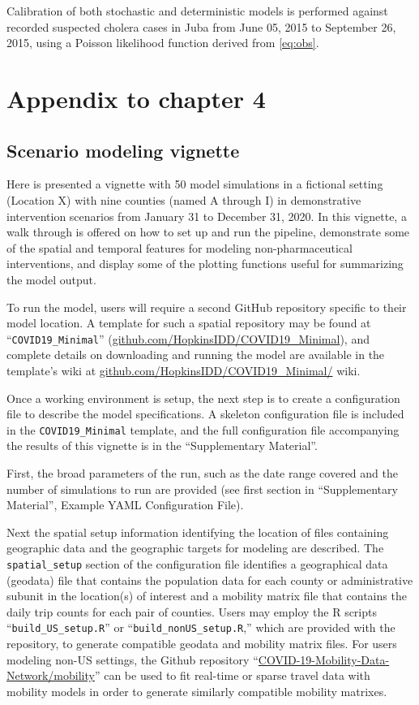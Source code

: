 Calibration of both stochastic and deterministic models is performed against recorded suspected cholera cases in Juba from June 05, 2015 to September 26, 2015, using a Poisson likelihood function derived from \ref{eq:obs}.


\chapter{Appendix to chapter 4}

\section{Scenario modeling vignette}
Here is presented a vignette with 50 model simulations in a fictional setting (Location X) with nine counties (named A through I) in demonstrative intervention scenarios from January 31 to December 31, 2020. In this vignette, a walk through is offered on how to set up and run the pipeline, demonstrate some of the spatial and temporal features for modeling non-pharmaceutical interventions, and display some of the plotting functions useful for summarizing the model output.

To run the model, users will require a second GitHub repository specific to their model location. A template for such a spatial repository may be found at “\verb|COVID19_Minimal|” (\url{github.com/HopkinsIDD/COVID19_Minimal}), and complete details on downloading and running the model are available in the template’s wiki at \url{github.com/HopkinsIDD/COVID19_Minimal/} wiki.

Once a working environment is setup, the next step is to create a configuration file to describe the model specifications. A skeleton configuration file is included in the \verb|COVID19_Minimal| template, and the full configuration file accompanying the results of this vignette is in the “Supplementary Material”.

First, the broad parameters of the run, such as the date range covered and the number of simulations to run are provided (see first section in “Supplementary Material”, Example YAML Configuration File).

Next the spatial setup information identifying the location of files containing geographic data and the geographic targets for modeling are described. The \verb|spatial_setup| section of the configuration file identifies a geographical data (geodata) file that contains the population data for each county or administrative subunit in the location(s) of interest and a mobility matrix file that contains the daily trip counts for each pair of counties. Users may employ the R scripts “\verb|build_US_setup.R|” or “\verb|build_nonUS_setup.R|,” which are provided with the repository, to generate compatible geodata and mobility matrix files. For users modeling non-US settings, the Github repository “\url{COVID-19-Mobility-Data-Network/mobility}” can be used to fit real-time or sparse travel data with mobility models in order to generate similarly compatible mobility matrixes\cite{Giles:COVID19MobilityDataNetworkMobilityV0:2020,Giles:MobilityPackageModeling:2020}.

